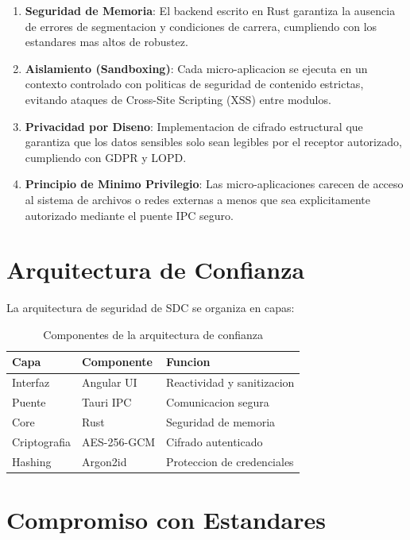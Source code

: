 \begin{enumerate}[leftmargin=*]
    \item \textbf{Seguridad de Memoria}: El backend escrito en Rust garantiza la ausencia de errores de segmentacion y condiciones de carrera, cumpliendo con los estandares mas altos de robustez.
    
    \item \textbf{Aislamiento (Sandboxing)}: Cada micro-aplicacion se ejecuta en un contexto controlado con politicas de seguridad de contenido estrictas, evitando ataques de Cross-Site Scripting (XSS) entre modulos.
    
    \item \textbf{Privacidad por Diseno}: Implementacion de cifrado estructural que garantiza que los datos sensibles solo sean legibles por el receptor autorizado, cumpliendo con GDPR y LOPD.
    
    \item \textbf{Principio de Minimo Privilegio}: Las micro-aplicaciones carecen de acceso al sistema de archivos o redes externas a menos que sea explicitamente autorizado mediante el puente IPC seguro.
\end{enumerate}

\section*{Arquitectura de Confianza}

La arquitectura de seguridad de SDC se organiza en capas:

\begin{table}[H]
\centering
\begin{tabular}{p{4cm}p{5cm}p{5cm}}
\toprule
\textbf{Capa} & \textbf{Componente} & \textbf{Funcion} \\
\midrule
Interfaz & Angular UI & Reactividad y sanitizacion \\
\midrule
Puente & Tauri IPC & Comunicacion segura \\
\midrule
Core & Rust & Seguridad de memoria \\
\midrule
Criptografia & AES-256-GCM & Cifrado autenticado \\
\midrule
Hashing & Argon2id & Proteccion de credenciales \\
\bottomrule
\end{tabular}
\caption{Componentes de la arquitectura de confianza}
\label{tab:arquitectura-confianza}
\end{table}

\section*{Compromiso con Estandares}

